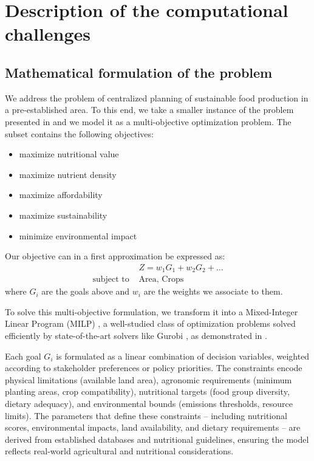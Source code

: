 \documentclass{oqireport}
\begin{document}
\section{Description of the computational challenges}

\subsection{Mathematical formulation of the problem}
We address the problem of centralized planning of sustainable food production in a pre-established area. To this end, we take a smaller instance of the problem presented in \cite{esteso_sustainable_2023} and we model it as a multi-objective optimization problem.
The subset contains the following objectives:
\begin{itemize}
    \item maximize nutritional value
    \item maximize nutrient density
    \item maximize affordability
    \item maximize sustainability
    \item minimize environmental impact
\end{itemize}
Our objective can in a first approximation be expressed as:
\begin{align}
    &Z = w_1G_1 + w_2 G_2 + \dots \\
    \text{subject to } &\text{Area, Crops}
    \label{eq:generalized objective}
\end{align}
where $G_i$ are the goals above and $w_i$ are the weights we associate to them.

To solve this multi-objective formulation, we transform it into a Mixed-Integer Linear Program (MILP) \cite{Dantzig1951}, a well-studied class of optimization problems solved efficiently by state-of-the-art solvers like Gurobi \cite{gurobi2023}, as demonstrated in \cite{esteso_sustainable_2023}.

Each goal $G_i$ is formulated as a linear combination of decision variables, weighted according to stakeholder preferences or policy priorities. The constraints encode physical limitations (available land area), agronomic requirements (minimum planting areas, crop compatibility), nutritional targets (food group diversity, dietary adequacy), and environmental bounds (emissions thresholds, resource limits). The parameters that define these constraints -- including nutritional scores, environmental impacts, land availability, and dietary requirements -- are derived from established databases and nutritional guidelines, ensuring the model reflects real-world agricultural and nutritional considerations.
\end{document}
